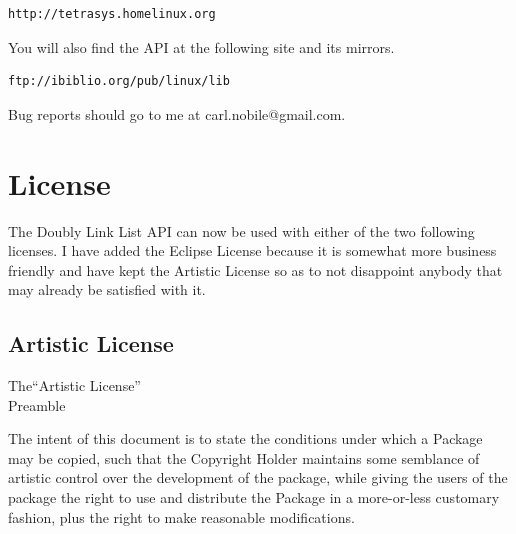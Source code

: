 \documentclass[10pt,letterpaper,titlepage]{article}
\begin{document}
\begin{verbatim}
http://tetrasys.homelinux.org
\end{verbatim}
\vspace{8pt}

\noindent
You will also find the API at the following site and its mirrors.
\vspace{8pt}

\begin{verbatim}
ftp://ibiblio.org/pub/linux/lib
\end{verbatim}
\vspace{8pt}

\noindent
Bug reports should go to me at carl.nobile@gmail.com.
\newpage

\section{License}
The Doubly Link List API can now be used with either of the two
following licenses. I have added the Eclipse License because it is
somewhat more business friendly and have kept the Artistic License so
as to not disappoint anybody that may already be satisfied with it.

\subsection{Artistic License}
\begin{center}
\Large			 The``Artistic License''\\
\vspace{8pt}
\Large				Preamble\\
\end{center}
\vspace{4pt}
The intent of this document is to state the conditions under which a Package may be copied, such that the Copyright Holder maintains some semblance of artistic control over the development of the package, while giving the users of the package the right to use and distribute the Package in a more-or-less customary fashion, plus the right to make reasonable modifications.
\vspace{8pt}
\end{document}
